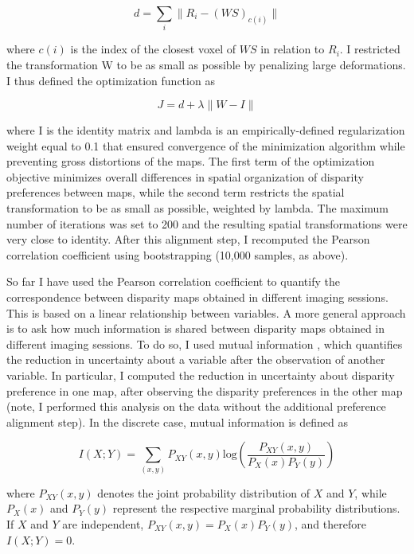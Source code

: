 \begin{equation}
d= \sum_{i} \| R_{i}-(WS)_{c(i)}\| 
\end{equation}

where $c(i)$ is the index of the closest voxel of $WS$ in relation to $R_i$. I restricted the transformation W to be as small as possible by penalizing large deformations. I thus defined the optimization function as

\begin{equation}
J=d+\lambda \| W-I \|
\end{equation}

where I is the identity matrix and lambda is an empirically-defined regularization weight equal to 0.1 that ensured convergence of the minimization algorithm while preventing gross distortions of the maps. The first term of the optimization objective minimizes overall differences in spatial organization of disparity preferences between maps, while the second term restricts the spatial transformation to be as small as possible, weighted by lambda. The maximum number of iterations was set to 200 and the resulting spatial transformations were very close to identity. After this alignment step, I recomputed the Pearson correlation coefficient using bootstrapping (10,000 samples, as above). 

So far I have used the Pearson correlation coefficient to quantify the correspondence between disparity maps obtained in different imaging sessions. This is based on a linear relationship between variables. A more general approach is to ask how much information is shared between disparity maps obtained in different imaging sessions. To do so, I used mutual information \cite{Shannon1948}, which quantifies the reduction in uncertainty about a variable after the observation of another variable. In particular, I computed the reduction in uncertainty about disparity preference in one map, after observing the disparity preferences in the other map (note, I performed this analysis on the data without the additional preference alignment step). In the discrete case, mutual information is defined as \cite{shannon1949}

\begin{equation}
I(X;Y)=\sum_{(x,y)}P_{XY} (x,y)  \mathrm{log}⁡\left(\frac{P_{XY}(x,y)}{P_X(x) P_Y(y)}\right)
\end{equation}

where $P_{XY}(x, y)$ denotes the joint probability distribution of $X$ and $Y$, while $P_X(x)$ and $P_Y(y)$ represent the respective marginal probability distributions. If $X$ and $Y$ are independent, $P_{XY}(x, y) = P_X(x) P_Y(y)$, and therefore $I (X; Y) = 0$.

